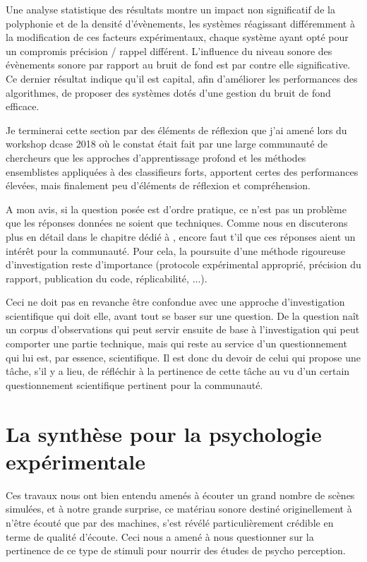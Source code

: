 Une analyse statistique des résultats\cite{lafayhal-01635414} montre un impact non significatif de la polyphonie et de la densité d'évènements, les systèmes réagissant différemment à la modification de ces facteurs expérimentaux, chaque système ayant opté pour un compromis précision / rappel différent. L'influence du niveau sonore des évènements sonore par rapport au bruit de fond est par contre elle significative. Ce dernier résultat indique qu'il est capital, afin d'améliorer les performances des algorithmes, de proposer des systèmes dotés d'une gestion du bruit de fond efficace.

Je terminerai cette section par des éléments de réflexion que j'ai amené lors du workshop dcase 2018 où le constat était fait par une large communauté de chercheurs que les approches d'apprentissage profond et les méthodes ensemblistes appliquées à des classifieurs forts, apportent certes des performances élevées, mais finalement peu d'éléments de réflexion et compréhension.

A mon avis, si la question posée est d'ordre pratique, ce n'est pas un problème que les réponses données ne soient que techniques. Comme nous en discuterons plus en détail dans le chapitre dédié à , encore faut t'il que ces réponses aient un intérêt pour la communauté. Pour cela, la poursuite d'une méthode rigoureuse d'investigation reste d'importance (protocole expérimental approprié, précision du rapport, publication du code, réplicabilité, ...).

Ceci ne doit pas en revanche être confondue avec une approche d'investigation scientifique qui doit elle, avant tout se baser sur une question. De la question naît un corpus d'observations qui peut servir ensuite de base à l'investigation qui peut comporter une partie technique, mais qui reste au service d'un questionnement qui lui est, par essence, scientifique. Il est donc du devoir de celui qui propose une tâche, s'il y a lieu, de réfléchir à la pertinence de cette tâche au vu d'un certain questionnement scientifique pertinent pour la communauté.

\section{ \nmu La  synthèse pour la psychologie expérimentale} \label{sec:psycho}

Ces travaux nous ont bien entendu amenés à écouter un grand nombre de scènes simulées, et à notre grande surprise, ce matériau sonore destiné originellement à n'être écouté que par des machines, s'est révélé particulièrement crédible en terme de qualité d'écoute. Ceci nous a amené à nous questionner sur la pertinence de ce type de stimuli pour nourrir des études de psycho perception.

